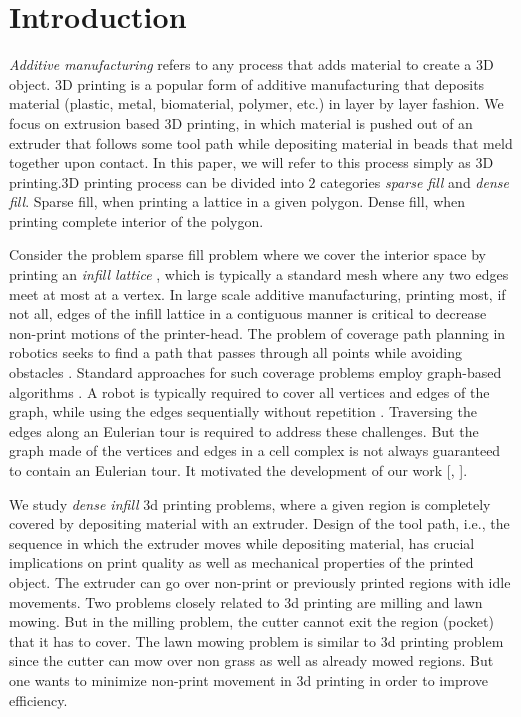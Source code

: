 \chapter{Introduction}
\emph{Additive manufacturing} refers to any process that adds material  to create a 3D object. %
3D printing is a popular form of additive manufacturing that deposits material (plastic, metal, biomaterial, polymer, etc.) in layer by layer fashion. %
We focus on extrusion based 3D printing, in which material is pushed out of an extruder that follows some tool path while depositing material in beads that meld together upon contact.
In this paper, we will refer to this process simply as $3$D printing.$3$D printing process can be divided into $2$ categories \textit{sparse fill} and \textit{dense fill}. Sparse fill, when printing a lattice in a given polygon. Dense fill, when printing complete interior of the polygon.

Consider the problem sparse fill problem where we cover the interior space by printing an \emph{infill lattice} \cite{BrBrWiHa2012,WuAaWeSi2018}, which is typically a standard mesh where any two edges meet at most at a vertex.
In large scale additive manufacturing,  printing most, if not all, edges of the infill lattice in a contiguous manner is critical to decrease non-print motions of the printer-head.
The problem of coverage path planning in robotics seeks to find a path that passes through all points while avoiding obstacles \cite{GaCa2013}.
Standard approaches for such coverage problems employ graph-based algorithms \cite{Xu2011}.
A robot is typically required to cover all vertices and edges of the graph, while using the edges sequentially without repetition \cite{CaHuHa1988}.
Traversing the edges along an Eulerian tour is required to address these challenges.
But the graph made of the vertices and edges in a cell complex is not always guaranteed to contain an Eulerian tour. It motivated the development of our work [\cite{GuKrDr2020}, \cite{GuKr2018}].

We study {\it dense infill} 3d printing problems, where a given region is completely covered by depositing material with an extruder.
  Design of the tool path, i.e., the sequence in which the extruder moves while depositing material, has crucial implications on print quality as well as mechanical properties of the printed object.
  The extruder can go over non-print or previously printed regions with idle movements.
  Two problems closely related to 3d printing are milling and lawn mowing.
  But in the milling problem, the cutter cannot exit the region (pocket) that it has to cover.  
  The lawn mowing problem is similar to 3d printing problem since the cutter can mow over non grass as well as already mowed regions.
  But one wants to minimize non-print movement in 3d printing in order to improve efficiency.
  
